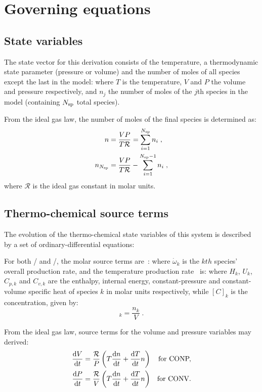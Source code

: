 \documentclass[12pt,number,sort&compress]{elsarticle}
\begin{document}
\section{Governing equations}
\subsection{State variables}
\label{s:state}
The state vector for this derivation consists of the temperature, a thermodynamic state parameter (pressure or volume) and the number of moles of all species except the last in the model:
where $T$ is the temperature, $V$ and $P$ the volume and pressure respectively, and $n_j$ the number of moles of the $j$th species in the model (containing $\ns/$ total species).

From the ideal gas law, the number of moles of the final species is determined as:
\begin{align}
\label{e:last_species}
n &= \frac{V P}{T \Ru/} = \sum_{i=1}^{\ns/}{n_i}\; , \nonumber \\
n_{\ns/} &= \frac{V P}{T \Ru/} - \sum_{i=1}^{\ns/ - 1}{n_i}\;,
\end{align}
where $\mathcal{R}$ is the ideal gas constant in molar units.

\subsection{Thermo-chemical source terms}
\label{s:source}
The evolution of the thermo-chemical state variables of this system is described by a set of ordinary-differential equations:

For both \conp/ and \conv/, the molar source terms are~\cite{TurnsStephenR2012Aitc}:
where $\dot{\omega}_k$ is the $kth$ species' overall production rate, and the temperature production rate~\cite{TurnsStephenR2012Aitc} is:
where $H_k$, $U_k$, $C_{p,k}$ and $C_{v, k}$ are the enthalpy, internal energy, constant-pressure and constant-volume specific heat of species $k$ in molar units respectively, while $[C]_{k}$ is the concentration, given by:
\begin{equation}
 [C]_{k} = \frac{n_{k}}{V}\;\text{.}
\end{equation}

From the ideal gas law, source terms for the volume and pressure variables may derived:
\begin{subequations}
\label{e:param_incomplete}
\begin{align}
\frac{\text{d} V }{\text{d} t } &= \frac{\Ru/}{P} \left(T \frac{\text{d} n }{\text{d} t } + \frac{\text{d} T }{\text{d} t } n\right) & \text{\dconp/,} \\
\frac{\text{d} P }{\text{d} t } &= \frac{\Ru/}{V} \left(T \frac{\text{d} n }{\text{d} t } + \frac{\text{d} T }{\text{d} t } n\right) & \text{\dconv/.}
\end{align}
\end{subequations}
\end{document}
